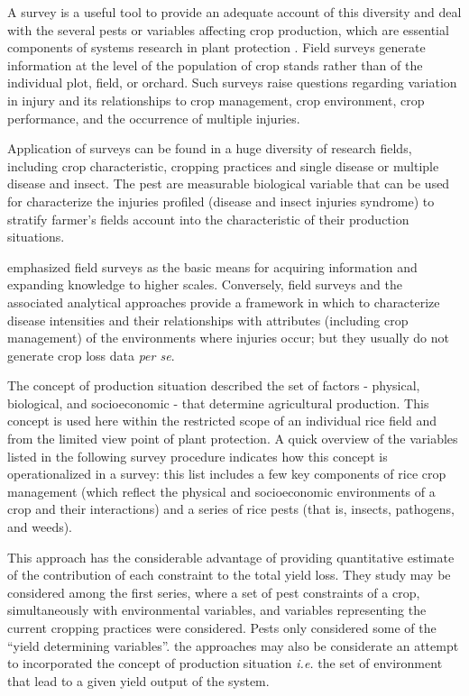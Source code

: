 A survey is a useful tool to provide an adequate account of this diversity and deal with the several pests or variables affecting crop production, which are essential components of systems research in plant protection \citet{Zadoks_1979_Epidem}. Field surveys generate information at the level of the population of crop stands rather than of the individual plot, field, or orchard. Such surveys raise questions regarding variation in injury and its relationships to crop management, crop environment, crop performance, and the occurrence of multiple injuries.


Application of surveys can be found in a huge diversity of research fields, including crop characteristic, cropping practices and single disease or multiple disease and insect. The pest are measurable biological variable that can be used for characterize the injuries profiled (disease and insect injuries syndrome) to stratify farmer's fields account into the characteristic of their production situations.

\cite{Savary_1995_Use} emphasized field surveys as the basic means for acquiring information and expanding knowledge to higher scales. Conversely, field surveys and the associated analytical approaches provide a framework in which to characterize disease intensities and their relationships with attributes (including crop management) of the environments where injuries occur; but they usually do not generate crop loss data \textit{per se}.


The concept of production situation described the set of factors - physical, biological, and socioeconomic - that determine agricultural production. This concept is used here within the restricted scope of an individual rice field and from the limited view point of plant protection. A quick overview of the variables listed in the following survey procedure indicates how this concept is operationalized in a survey: this list includes a few key components of rice crop management (which reflect the physical and socioeconomic environments of a crop and their interactions) and a series of rice pests (that is, insects, pathogens, and weeds).

This approach has the considerable advantage of providing quantitative estimate of the contribution of each constraint to the total yield loss. They study may be considered among the first series, where a set of pest constraints of a crop, simultaneously with environmental variables, and variables representing the current cropping practices were considered. Pests only considered some of the ``yield determining variables''. the approaches may also be considerate an attempt to incorporated the concept of production situation \textit{i.e.} the set of environment that lead to a given yield output of the system. 


